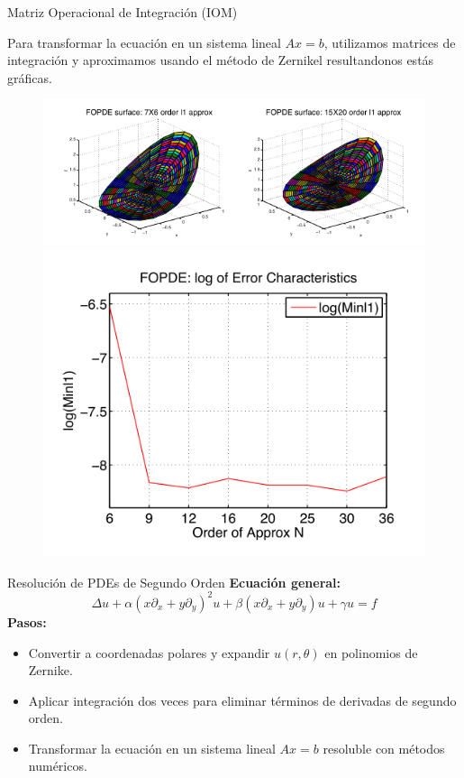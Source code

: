 \documentclass{beamer}
\begin{document}
\begin{frame}{Matriz Operacional de Integración (IOM)}

Para transformar la ecuación en un sistema lineal \( Ax = b \), utilizamos matrices de integración y aproximamos usando el método de Zernikel resultandonos estás gráficas.
  \begin{figure}[H]
\begin{center}
  \includegraphics[scale=0.5]{Figures/polejemplo.png}
  \includegraphics[scale=0.3]{Figures/pol2ejemplo.png}
\end{center}
\end{figure}  
\end{frame}



\begin{frame}{Resolución de PDEs de Segundo Orden}
    \textbf{Ecuación general:}
    \[
    \Delta u + \alpha (x\partial_x + y\partial_y)^2 u + \beta (x\partial_x + y\partial_y) u + \gamma u = f
    \]
    \textbf{Pasos:}
    \begin{itemize}
        \item Convertir a coordenadas polares y expandir \( u(r, \theta) \) en polinomios de Zernike.
        \item Aplicar integración dos veces para eliminar términos de derivadas de segundo orden.
        \item Transformar la ecuación en un sistema lineal \( Ax = b \) resoluble con métodos numéricos.
    \end{itemize}
\end{frame}
\end{document}
